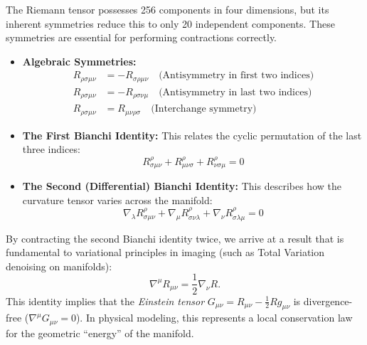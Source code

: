 The Riemann tensor possesses 256 components in four dimensions, but its inherent symmetries reduce this to only 20 independent components. These symmetries are essential for performing contractions correctly.

\begin{itemize}
  \item \textbf{Algebraic Symmetries:}
    \begin{align}
      R_{\rho\sigma\mu\nu} &= -R_{\sigma\rho\mu\nu} \quad \text{(Antisymmetry in first two indices)} \\
      R_{\rho\sigma\mu\nu} &= -R_{\rho\sigma\nu\mu} \quad \text{(Antisymmetry in last two indices)} \\
      R_{\rho\sigma\mu\nu} &= R_{\mu\nu\rho\sigma} \quad \text{(Interchange symmetry)}
    \end{align}

  \item \textbf{The First Bianchi Identity:} This relates the cyclic permutation of the last three indices:
    \[ R^\rho_{\sigma\mu\nu} + R^\rho_{\mu\nu\sigma} + R^\rho_{\nu\sigma\mu} = 0 \]

  \item \textbf{The Second (Differential) Bianchi Identity:} This describes how the curvature tensor varies across the manifold:
    \[ \nabla_\lambda R^\rho_{\sigma\mu\nu} + \nabla_\mu R^\rho_{\sigma\nu\lambda} + \nabla_\nu R^\rho_{\sigma\lambda\mu} = 0 \]
\end{itemize}

By contracting the second Bianchi identity twice, we arrive at a result that is fundamental to variational principles in imaging (such as Total Variation denoising on manifolds):
\begin{equation}
  \nabla^\mu R_{\mu\nu} = \frac{1}{2} \nabla_\nu R
.\end{equation}
This identity implies that the \emph{Einstein tensor} $G_{\mu\nu} = R_{\mu\nu} - \frac{1}{2}Rg_{\mu\nu}$ is divergence-free ($\nabla^\mu G_{\mu\nu} = 0$). In physical modeling, this represents a local conservation law for the geometric ``energy'' of the manifold.

